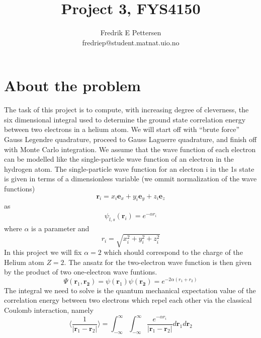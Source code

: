 \documentclass[a4paper,english, 10pt, twoside]{article}
\title{Project 3, FYS4150}
\author{Fredrik E Pettersen\\ fredriep@student.matnat.uio.no}
\begin{document}
\maketitle

\begin{abstract}

\end{abstract}

\section*{About the problem}
The task of this project is to compute, with increasing degree of cleverness, the six dimensional integral used to determine the 
ground state correlation energy between two electrons in a helium atom. We will start off with ``brute force'' Gauss Legendre 
quadrature, proceed to Gauss Laguerre quadrature, and finish off with Monte Carlo integration. We assume that the wave function 
of each electron can be modelled like the single-particle wave function of an electron in the hydrogen atom. The single-particle 
wave function for an electron i in the 1s state is given in terms of a dimensionless variable (we ommit normalization of the wave 
functions)
$$
\mathbf{r}_i = x_i\mathbf{e}_x + y_i\mathbf{e}_y + z_i\mathbf{e}_z
$$
as
\begin{align*}
 \psi_{l,s}(\mathbf{r}_i) = e^{-\alpha r_i}
\end{align*}
where $\alpha$ is a parameter and 
$$
r_i = \sqrt{x_i^2 + y_i^2 + z_i^2}
$$
In this project we will fix $\alpha = 2$ which should correspond to the charge of the Helium atom $Z = 2$.
The ansatz for the two-electron wave function is then given by the product of two one-electron wave funtions.
$$
\Psi(\mathbf{r}_1,\mathbf{r_2}) = \psi(\mathbf{r}_1)\psi(\mathbf{r_2}) = e^{-2\alpha(r_1+r_2)}
$$
The integral we need to solve is the quantum mechanical expectation value of the
correlation energy between two electrons which repel each other via the classical Coulomb
interaction, namely
$$
\langle\frac{1}{\left|\mathbf{r}_1-\mathbf{r}_2\right|}\rangle = \int^\infty_{-\infty}\int^\infty_{-\infty}
\frac{ e^{-\alpha r_i}}{\left|\mathbf{r}_1-\mathbf{r}_2\right|}d\mathbf{r}_1d\mathbf{r}_2
$$
\end{document}
